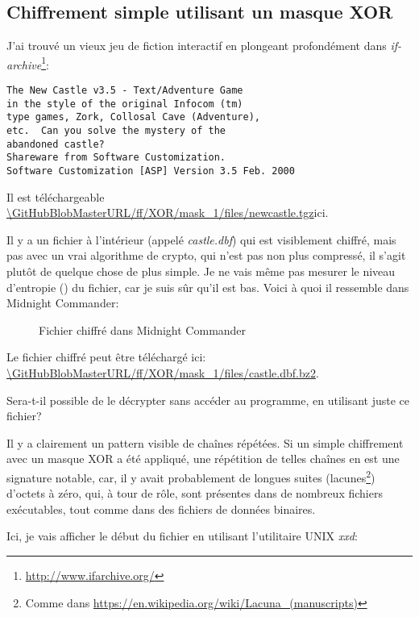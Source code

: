 \subsection{Chiffrement simple utilisant un masque XOR}
\label{XOR_mask_1}

J'ai trouvé un vieux jeu de fiction interactif en plongeant profondément dans \emph{if-archive}\footnote{\url{http://www.ifarchive.org/}}:

\begin{lstlisting}
The New Castle v3.5 - Text/Adventure Game
in the style of the original Infocom (tm)
type games, Zork, Collosal Cave (Adventure),
etc.  Can you solve the mystery of the
abandoned castle?
Shareware from Software Customization.
Software Customization [ASP] Version 3.5 Feb. 2000
\end{lstlisting}

Il est téléchargeable
\url{\GitHubBlobMasterURL/ff/XOR/mask_1/files/newcastle.tgz}{ici}.

Il y a un fichier à l'intérieur (appelé \emph{castle.dbf}) qui est visiblement chiffré,
mais pas avec un vrai algorithme de crypto, qui n'est pas non plus compressé, il
s'agit plutôt de quelque chose de plus simple.
Je ne vais même pas mesurer le niveau d'entropie () du fichier, car
je suis sûr qu'il est bas.
Voici à quoi il ressemble dans Midnight Commander:

\begin{figure}[H]
\centering
{}
\caption{Fichier chiffré dans Midnight Commander}
\end{figure}

Le fichier chiffré peut être téléchargé ici:
\url{\GitHubBlobMasterURL/ff/XOR/mask_1/files/castle.dbf.bz2}.

Sera-t-il possible de le décrypter sans accéder au programme, en utilisant juste ce
fichier?

Il y a clairement un pattern visible de chaînes répétées.
Si un simple chiffrement avec un masque XOR a été appliqué, une répétition de telles
chaînes en est une signature notable, car, il y avait probablement de longues
suites (lacunes\footnote{Comme dans \url{https://en.wikipedia.org/wiki/Lacuna_(manuscripts)}})
d'octets à zéro, qui, à tour de rôle, sont présentes dans de nombreux
fichiers exécutables, tout comme dans des fichiers de données binaires.

Ici, je vais afficher le début du fichier en utilisant l'utilitaire UNIX \emph{xxd}:

